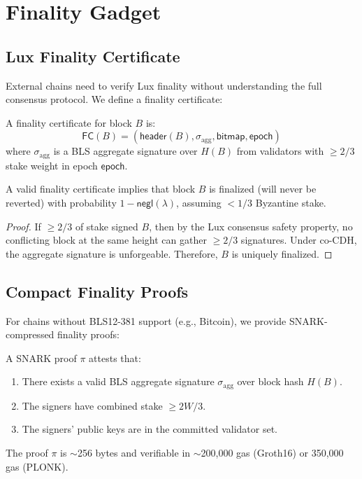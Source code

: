 \section{Finality Gadget}
\label{sec:finality}

\subsection{Lux Finality Certificate}

External chains need to verify Lux finality without understanding the full consensus protocol. We define a finality certificate:

\begin{definition}
A finality certificate for block $B$ is:
\begin{equation}
    \mathsf{FC}(B) = (\mathsf{header}(B), \sigma_{\text{agg}}, \mathsf{bitmap}, \mathsf{epoch})
\end{equation}
where $\sigma_{\text{agg}}$ is a BLS aggregate signature over $H(B)$ from validators with $\geq 2/3$ stake weight in epoch $\mathsf{epoch}$.
\end{definition}

\begin{theorem}
A valid finality certificate implies that block $B$ is finalized (will never be reverted) with probability $1 - \mathsf{negl}(\lambda)$, assuming $< 1/3$ Byzantine stake.
\end{theorem}

\begin{proof}
If $\geq 2/3$ of stake signed $B$, then by the Lux consensus safety property, no conflicting block at the same height can gather $\geq 2/3$ signatures. Under co-CDH, the aggregate signature is unforgeable. Therefore, $B$ is uniquely finalized.
\end{proof}

\subsection{Compact Finality Proofs}

For chains without BLS12-381 support (e.g., Bitcoin), we provide SNARK-compressed finality proofs:

\begin{definition}
A SNARK proof $\pi$ attests that:
\begin{enumerate}
    \item There exists a valid BLS aggregate signature $\sigma_{\text{agg}}$ over block hash $H(B)$.
    \item The signers have combined stake $\geq 2W/3$.
    \item The signers' public keys are in the committed validator set.
\end{enumerate}
The proof $\pi$ is $\sim$256 bytes and verifiable in $\sim$200,000 gas (Groth16) or 350,000 gas (PLONK).
\end{definition}

